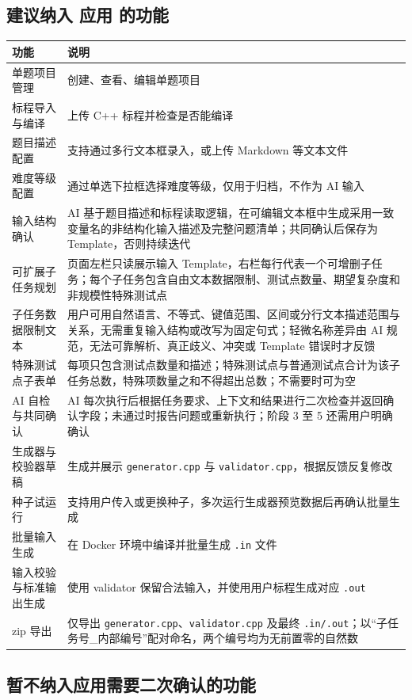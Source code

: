 \documentclass[UTF8,zihao=-4]{ctexart}
\begin{document}
\subsection{建议纳入 应用 的功能}

\begin{longtable}{p{4cm}p{9.5cm}}
\toprule
功能 & 说明 \\
\midrule
单题项目管理 & 创建、查看、编辑单题项目  \\
标程导入与编译 & 上传 C++ 标程并检查是否能编译  \\
题目描述配置 & 支持通过多行文本框录入，或上传 Markdown 等文本文件  \\
难度等级配置 & 通过单选下拉框选择难度等级，仅用于归档，不作为 AI 输入  \\
输入结构确认 & AI 基于题目描述和标程读取逻辑，在可编辑文本框中生成采用一致变量名的非结构化输入描述及完整问题清单；共同确认后保存为 Template，否则持续迭代  \\
可扩展子任务规划 & 页面左栏只读展示输入 Template，右栏每行代表一个可增删子任务；每个子任务包含自由文本数据限制、测试点数量、期望复杂度和非规模性特殊测试点  \\
子任务数据限制文本 & 用户可用自然语言、不等式、键值范围、区间或分行文本描述范围与关系，无需重复输入结构或改写为固定句式；轻微名称差异由 AI 规范，无法可靠解析、真正歧义、冲突或 Template 错误时才反馈  \\
特殊测试点子表单 & 每项只包含测试点数量和描述；特殊测试点与普通测试点合计为该子任务总数，特殊项数量之和不得超出总数；不需要时可为空  \\
AI 自检与共同确认 & AI 每次执行后根据任务要求、上下文和结果进行二次检查并返回确认字段；未通过时报告问题或重新执行；阶段 3 至 5 还需用户明确确认  \\
生成器与校验器草稿 & 生成并展示 \texttt{generator.cpp} 与 \texttt{validator.cpp}，根据反馈反复修改  \\
种子试运行 & 支持用户传入或更换种子，多次运行生成器预览数据后再确认批量生成  \\
批量输入生成 & 在 Docker 环境中编译并批量生成 \texttt{.in} 文件  \\
输入校验与标准输出生成 & 使用 validator 保留合法输入，并使用用户标程生成对应 \texttt{.out}  \\
zip 导出 & 仅导出 \texttt{generator.cpp}、\texttt{validator.cpp} 及最终 \texttt{.in/.out}；以“子任务号\_内部编号”配对命名，两个编号均为无前置零的自然数  \\
\bottomrule
\end{longtable}

\subsection{暂不纳入应用需要二次确认的功能}
\end{document}
